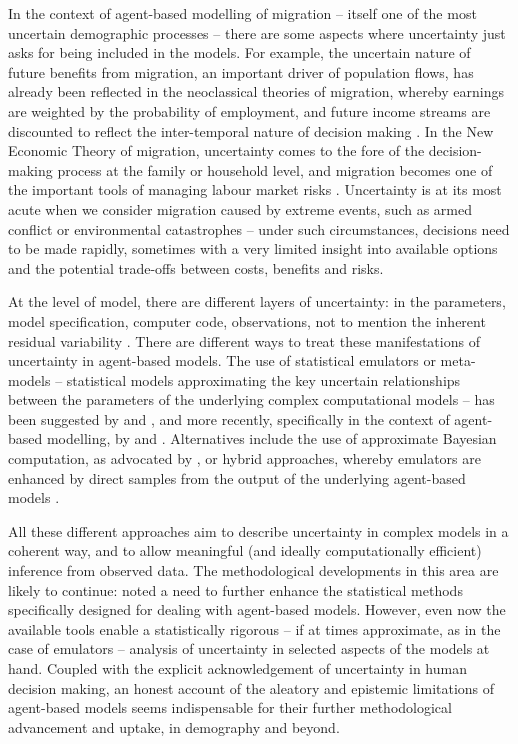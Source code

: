 \documentclass{article}
\begin{document}
In the context of agent-based modelling of migration -- itself one of the most uncertain demographic processes -- there are some aspects where uncertainty just asks for being included in the models. For example, the uncertain nature of future benefits from migration, an important driver of population flows, has already been reflected in the neoclassical theories of migration, whereby earnings are weighted by the probability of employment, and future income streams are discounted to reflect the inter-temporal nature of decision making \citep{Massey1993}. In the New Economic Theory of migration, uncertainty comes to the fore of the decision-making process at the family or household level, and migration becomes one of the important tools of managing labour market risks \citep{Stark1985}. Uncertainty is at its most acute when we consider migration caused by extreme events, such as armed conflict or environmental catastrophes -- under such circumstances, decisions need to be made rapidly, sometimes with a very limited insight into available options and the potential trade-offs between costs, benefits and risks. 

At the level of model, there are different layers of uncertainty: in the parameters, model specification, computer code, observations, not to mention the inherent residual variability \citep{Kennedy2001}. There are different ways to treat these manifestations of uncertainty in agent-based models. The use of statistical emulators or meta-models \citep{Kleijnen2000} -- statistical models approximating the key uncertain relationships between the parameters of the underlying complex computational models -- has been suggested by \citet{Kennedy2001} and \citet{Oakley2004}, and more recently, specifically in the context of agent-based modelling, by \citet{Heard2015} and \citet{Hilton2016}. Alternatives include the use of approximate Bayesian computation, as advocated by \citet{Grazzini2017}, or hybrid approaches, whereby emulators are enhanced by direct samples from the output of the underlying agent-based models \citep{Kaminski2015}. 

All these different approaches aim to describe uncertainty in complex models in a coherent way, and to allow meaningful (and ideally computationally efficient) inference from observed data. The methodological developments in this area are likely to continue: \citet{Heard2015} noted a need to further enhance the statistical methods specifically designed for dealing with agent-based models. However, even now the available tools enable a statistically rigorous -- if at times approximate, as in the case of emulators -- analysis of uncertainty in selected aspects of the models at hand. Coupled with the explicit acknowledgement of uncertainty in human decision making, an honest account of the aleatory and epistemic limitations of agent-based models seems indispensable for their further methodological advancement and uptake, in demography and beyond.
\end{document}
